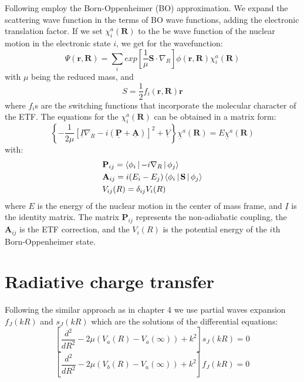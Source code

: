 Following \cite{Zygelman89}  employ the Born-Oppenheimer (BO) approximation. We expand the scattering wave function in the terms of BO wave functions, adding the electronic translation factor. 
If we set $ \chi_i^a(\mathbf{R}) $ to the be wave function of the nuclear motion in the electronic state $ i $, we get for the wavefunction:
\begin{equation}
\Psi(\mathbf{r},\mathbf{R}) = \sum_i{exp\left[\frac{1}{\mu}\mathbf{S}\cdot\nabla_R \right]\phi(\mathbf{r},\mathbf{R}) }\chi_i^a(\mathbf{R})
\end{equation}
with $ \mu $ being the reduced mass, and 
\begin{equation}
S = \frac{1}{2}f_i(\mathbf{r},\mathbf{R})\mathbf{r}
\end{equation}
where $ f_i $s are the switching functions that incorporate the molecular character of the ETF.
The equations for the $ \chi_i^a(\mathbf{R}) $ can be obtained in a matrix form:
\begin{equation}
\left\{-\frac{1}{2\mu}\left[\underline{I}\nabla_R - i(\underline{\mathbf{P}} + \underline{\mathbf{A}})\right]^2 + \underline{V}\right\}\underline{\chi}^a(\mathbf{R}) = E\underline{\chi}^a(\mathbf{R})
\end{equation}
with:
\begin{equation}\label{matrixFactors1}
\begin{split}
& \mathbf{P}_{ij} = \Braket{\phi_i | -i\nabla_R | \phi_j} \\*
& \mathbf{A}_{ij} = i(E_i - E_j)\Braket{\phi_i | \mathbf{S} | \phi_j} \\*
& V_{ij}(R) = \delta_{ij}V_i(R)
\end{split}
\end{equation}
where $ E $ is the energy of the nuclear motion in the center of mass frame, and $ \underline{I} $ is the identity matrix. The matrix $ \mathbf{P}_{ij} $ represents the non-adiabatic coupling, the $ \mathbf{A}_{ij} $ is the ETF correction, and the $ V_i(R) $ is the potential energy of the $ i $th Born-Oppenheimer state.

\section{ Radiative charge transfer}

Following the similar approach as in chapter 4 we use partial waves expansion $ f_J(kR) $ and $ s_J(kR) $ which are the solutions of the differential equations:
\begin{equation}
\left[\frac{d^2}{dR^2} - 2\mu\left(V_a(R) - V_a(\infty)\right)+k^2\right]s_J(kR) = 0
\end{equation}
\begin{equation}
\left[\frac{d^2}{dR^2} - 2\mu\left(V_b(R) - V_a(\infty)\right)+k^2\right]f_J(kR) = 0
\end{equation}

